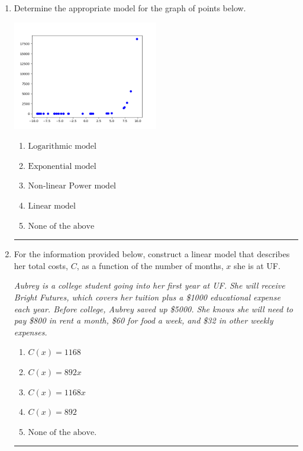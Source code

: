 \documentclass[14pt]{extbook}
\newcommand{\litem}[1]{\item#1\hspace*{-1cm}\rule{\textwidth}{0.4pt}}
\begin{document}
\begin{enumerate}
{\begin{enumerate}[label=\Alph*.]
\end{enumerate} }
\litem{
Determine the appropriate model for the graph of points below.
\begin{center}
    \includegraphics[width=0.5\textwidth]{../Figures/identifyModelGraph12A.png}
\end{center}
\begin{enumerate}[label=\Alph*.]
\item \( \text{Logarithmic model} \)
\item \( \text{Exponential model} \)
\item \( \text{Non-linear Power model} \)
\item \( \text{Linear model} \)
\item \( \text{None of the above} \)

\end{enumerate} }
\litem{
For the information provided below, construct a linear model that describes her total costs, $C$, as a function of the number of months, $x$ she is at UF. 
\begin{center}
    \textit{ Aubrey is a college student going into her first year at UF. She will receive Bright Futures, which covers her tuition plus a \$1000 educational expense each year. Before college, Aubrey saved up \$5000. She knows she will need to pay \$800 in rent a month, \$60 for food a week, and \$32 in other weekly expenses. }
\end{center}
\begin{enumerate}[label=\Alph*.]
\item \( C(x) = 1168 \)
\item \( C(x) = 892 x \)
\item \( C(x) = 1168 x \)
\item \( C(x) = 892 \)
\item \( \text{None of the above.} \)


\end{enumerate}}
\end{enumerate}
\end{document}
